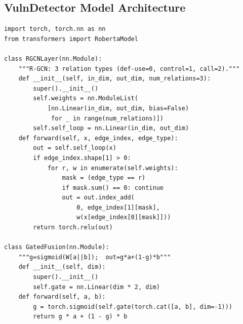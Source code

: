 \documentclass[12pt, letterpaper]{article}
\begin{document}
\newpage



\newpage
\begin{appendices}

\section{VulnDetector Model Architecture}
\label{app:model}

\begin{lstlisting}[caption={step4\_model/full\_model.py — core architecture},
                   label={lst:model}]
import torch, torch.nn as nn
from transformers import RobertaModel

class RGCNLayer(nn.Module):
    """R-GCN: 3 relation types (def-use=0, control=1, call=2)."""
    def __init__(self, in_dim, out_dim, num_relations=3):
        super().__init__()
        self.weights = nn.ModuleList(
            [nn.Linear(in_dim, out_dim, bias=False)
             for _ in range(num_relations)])
        self.self_loop = nn.Linear(in_dim, out_dim)
    def forward(self, x, edge_index, edge_type):
        out = self.self_loop(x)
        if edge_index.shape[1] > 0:
            for r, w in enumerate(self.weights):
                mask = (edge_type == r)
                if mask.sum() == 0: continue
                out = out.index_add(
                    0, edge_index[1][mask],
                    w(x[edge_index[0][mask]]))
        return torch.relu(out)

class GatedFusion(nn.Module):
    """g=sigmoid(W[a||b]);  out=g*a+(1-g)*b"""
    def __init__(self, dim):
        super().__init__()
        self.gate = nn.Linear(dim * 2, dim)
    def forward(self, a, b):
        g = torch.sigmoid(self.gate(torch.cat([a, b], dim=-1)))
        return g * a + (1 - g) * b


\end{lstlisting}
\end{appendices}
\end{document}
